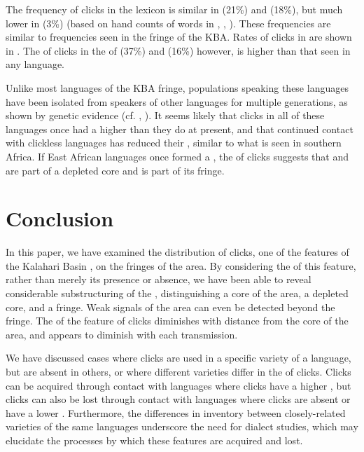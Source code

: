 \documentclass[output=paper,newtxmath,modfonts,nonflat,draftmode]{langsci/langscibook}
\begin{document}
The frequency of clicks in the lexicon is similar in  (21\%) and  (18\%), but much lower in  (3\%) (based on hand counts of words in \citealt{Miller2012}, \citealt{Ten2012}, \citealt{Tosco1991}). These frequencies are similar to frequencies seen in the fringe of the KBA. Rates of clicks in  are shown in . The  of clicks in the  of  (37\%) and  (16\%) however, is higher than that seen in any  language. 

\newpage 
Unlike most languages of the KBA fringe, populations speaking these languages have been isolated from speakers of other  languages for multiple generations, as shown by genetic evidence (cf. \citealt{Schlebush2012}, \citealt{Soi2015}). It seems likely that clicks in all of these languages once had a higher  than they do at present, and that continued contact with clickless languages has reduced their , similar to what is seen in southern Africa. If East African  languages once formed a , the  of clicks suggests that  and  are part of a depleted core and  is part of its fringe. 

\section{Conclusion}\label{sec:sands:7}

In this paper, we have examined the distribution of clicks, one of the features of the Kalahari Basin , on the fringes of the area. By considering the  of this feature, rather than merely its presence or absence, we have been able to reveal considerable substructuring of the , distinguishing a core of the area, a depleted core, and a fringe. Weak signals of the area can even be detected beyond the fringe. The  of the feature of clicks diminishes with distance from the core of the area, and appears to diminish with each transmission. 

We have discussed cases where clicks are used in a specific variety of a language, but are absent in others, or where different varieties differ in the  of clicks. Clicks can be acquired through contact with languages where clicks have a higher , but clicks can also be lost through contact with languages where clicks are absent or have a lower . Furthermore, the differences in  inventory between closely-related varieties of the same languages underscore the need for dialect studies, which may elucidate the processes by which these features are acquired and lost. 
\end{document}
